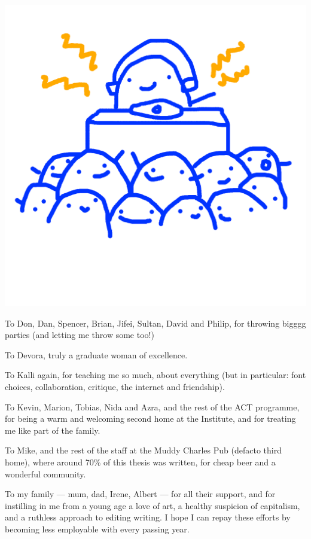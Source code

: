 \documentclass[nofonts,nols,justified,nobib]{tufte-book}
\begin{document}
\begin{marginfigure}
\includegraphics[width=\textwidth]{img/1/99f.png}
\end{marginfigure}

To Don, Dan, Spencer, Brian, Jifei, Sultan, David and Philip, for throwing bigggg parties (and letting me throw some too!)

To Devora, truly a graduate woman of excellence.

To Kalli again, for teaching me so much, about everything (but in particular: font choices, collaboration, critique, the internet and friendship).

To Kevin, Marion, Tobias, Nida and Azra, and the rest of the ACT programme, for being a warm and welcoming second home at the Institute, and for treating me like part of the family.

To Mike, and the rest of the staff at the Muddy Charles Pub (defacto third home), where around 70\% of this thesis was written, for cheap beer and a wonderful community.

To my family — mum, dad, Irene, Albert — for all their support, and for instilling in me from a young age a love of art, a healthy suspicion of capitalism, and a ruthless approach to editing writing. I hope I can repay these efforts by becoming less employable with every passing year.
\end{document}
